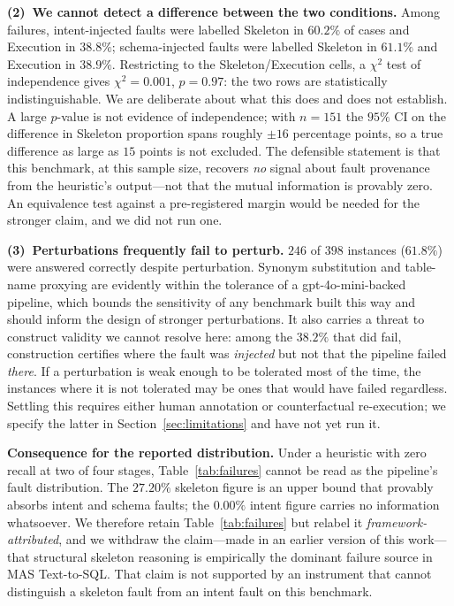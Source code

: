 \documentclass[conference]{IEEEtran}
\begin{document}
\noindent\textbf{(2)~We cannot detect a difference between the two conditions.}
Among failures, intent-injected faults were labelled Skeleton in $60.2\%$ of
cases and Execution in $38.8\%$; schema-injected faults were labelled Skeleton
in $61.1\%$ and Execution in $38.9\%$. Restricting to the Skeleton/Execution
cells, a $\chi^2$ test of independence gives $\chi^2 = 0.001$, $p = 0.97$: the
two rows are statistically indistinguishable. We are deliberate about what this
does and does not establish. A large $p$-value is not evidence of independence;
with $n = 151$ the $95\%$ CI on the difference in Skeleton proportion spans
roughly $\pm 16$ percentage points, so a true difference as large as $15$
points is not excluded. The defensible statement is that this benchmark, at
this sample size, recovers \emph{no} signal about fault provenance from the
heuristic's output---not that the mutual information is provably zero. An
equivalence test against a pre-registered margin would be needed for the
stronger claim, and we did not run one.

\noindent\textbf{(3)~Perturbations frequently fail to perturb.} $246$ of $398$
instances ($61.8\%$) were answered correctly despite perturbation. Synonym
substitution and table-name proxying are evidently within the tolerance of a
gpt-4o-mini-backed pipeline, which bounds the sensitivity of any benchmark built
this way and should inform the design of stronger perturbations. It also
carries a threat to construct validity we cannot resolve here: among the
$38.2\%$ that did fail, construction certifies where the fault was
\emph{injected} but not that the pipeline failed \emph{there}. If a
perturbation is weak enough to be tolerated most of the time, the instances
where it is not tolerated may be ones that would have failed regardless.
Settling this requires either human annotation or counterfactual re-execution;
we specify the latter in Section~\ref{sec:limitations} and have not yet run it.

\noindent\textbf{Consequence for the reported distribution.} Under a heuristic
with zero recall at two of four stages, Table~\ref{tab:failures} cannot be
read as the pipeline's fault distribution. The $27.20\%$ skeleton figure is an
upper bound that provably absorbs intent and schema faults; the $0.00\%$
intent figure carries no information whatsoever. We therefore retain
Table~\ref{tab:failures} but relabel it \emph{framework-attributed}, and we
withdraw the claim---made in an earlier version of this work---that structural
skeleton reasoning is empirically the dominant failure source in MAS
Text-to-SQL. That claim is not supported by an instrument that cannot
distinguish a skeleton fault from an intent fault on this benchmark.
\end{document}

